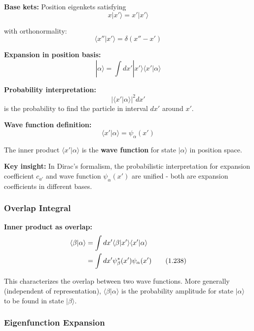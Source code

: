 \documentclass[11pt,a4paper]{article}
\begin{document}
\textbf{Base kets:} Position eigenkets satisfying
\begin{equation}
x|x'\rangle = x'|x'\rangle
\tag{1.233}
\end{equation}

with orthonormality:
\begin{equation}
\langle x''|x'\rangle = \delta(x'' - x')
\tag{1.234}
\end{equation}

\textbf{Expansion in position basis:}
\begin{equation}
|\alpha\rangle = \int dx'|x'\rangle\langle x'|\alpha\rangle
\tag{1.235}
\end{equation}

\textbf{Probability interpretation:}
\begin{equation}
|\langle x'|\alpha\rangle|^2 dx'
\tag{1.236}
\end{equation}
is the probability to find the particle in interval $dx'$ around $x'$.

\textbf{Wave function definition:}
\begin{equation}
\boxed{\langle x'|\alpha\rangle = \psi_\alpha(x')}
\tag{1.237}
\end{equation}

The inner product $\langle x'|\alpha\rangle$ is the \textbf{wave function} for state $|\alpha\rangle$ in position space.

\textbf{Key insight:} In Dirac's formalism, the probabilistic interpretation for expansion coefficient $c_{a'}$ and wave function $\psi_\alpha(x')$ are unified - both are expansion coefficients in different bases.

\subsubsection{Overlap Integral}

\textbf{Inner product as overlap:}
\begin{align}
\langle\beta|\alpha\rangle &= \int dx'\langle\beta|x'\rangle\langle x'|\alpha\rangle \notag \\
&= \int dx'\psi_\beta^*(x')\psi_\alpha(x')
\tag{1.238}
\end{align}

This characterizes the overlap between two wave functions. More generally (independent of representation), $\langle\beta|\alpha\rangle$ is the probability amplitude for state $|\alpha\rangle$ to be found in state $|\beta\rangle$.

\subsubsection{Eigenfunction Expansion}
\end{document}
